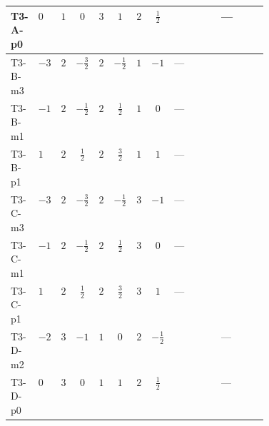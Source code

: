 \documentclass[8pt]{article}
\begin{document}
\begin{landscape}
\begin{longtable}{@{}llcccccc >{\raggedright\arraybackslash}p{0.21\linewidth} >{\raggedright\arraybackslash}p{0.21\linewidth}@{}}
\midrule
T3-A-p0 & $0$ & $1$ & $0$ & $3$ & $1$ & $2$ & $\frac{1}{2}$ & \scriptsize\adjustbox{max width=\linewidth}{$\begin{gathered} -\frac{{g_2}^3}{2}\end{gathered}$} & --- \\
\midrule
T3-B-m3 & $-3$ & $2$ & $-\frac{3}{2}$ & $2$ & $-\frac{1}{2}$ & $1$ & $-1$ & --- & \scriptsize\adjustbox{max width=\linewidth}{$\begin{gathered} -\frac{17 {g_2}^3}{6}\end{gathered}$} \\
\midrule
T3-B-m1 & $-1$ & $2$ & $-\frac{1}{2}$ & $2$ & $\frac{1}{2}$ & $1$ & $0$ & --- & \scriptsize\adjustbox{max width=\linewidth}{$\begin{gathered} -\frac{17 {g_2}^3}{6}\end{gathered}$} \\
\midrule
T3-B-p1 & $1$ & $2$ & $\frac{1}{2}$ & $2$ & $\frac{3}{2}$ & $1$ & $1$ & --- & \scriptsize\adjustbox{max width=\linewidth}{$\begin{gathered} -\frac{17 {g_2}^3}{6}\end{gathered}$} \\
\midrule
T3-C-m3 & $-3$ & $2$ & $-\frac{3}{2}$ & $2$ & $-\frac{1}{2}$ & $3$ & $-1$ & --- & \scriptsize\adjustbox{max width=\linewidth}{$\begin{gathered} \frac{31 {g_2}^3}{6}\end{gathered}$} \\
\midrule
T3-C-m1 & $-1$ & $2$ & $-\frac{1}{2}$ & $2$ & $\frac{1}{2}$ & $3$ & $0$ & --- & \scriptsize\adjustbox{max width=\linewidth}{$\begin{gathered} \frac{7 {g_2}^3}{6}\end{gathered}$} \\
\midrule
T3-C-p1 & $1$ & $2$ & $\frac{1}{2}$ & $2$ & $\frac{3}{2}$ & $3$ & $1$ & --- & \scriptsize\adjustbox{max width=\linewidth}{$\begin{gathered} \frac{31 {g_2}^3}{6}\end{gathered}$} \\
\midrule
T3-D-m2 & $-2$ & $3$ & $-1$ & $1$ & $0$ & $2$ & $-\frac{1}{2}$ & \scriptsize\adjustbox{max width=\linewidth}{$\begin{gathered} -\frac{{g_2}^3}{2}\end{gathered}$} & --- \\
\midrule
T3-D-p0 & $0$ & $3$ & $0$ & $1$ & $1$ & $2$ & $\frac{1}{2}$ & \scriptsize\adjustbox{max width=\linewidth}{$\begin{gathered} -\frac{{g_2}^3}{2}\end{gathered}$} & --- \\

\end{longtable}
\end{landscape}
\end{document}
